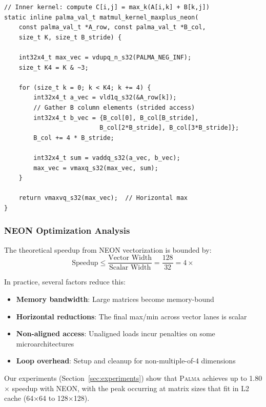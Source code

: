 \documentclass[11pt,a4paper]{article}
\theoremstyle{plain}
\theoremstyle{definition}
\newcommand{\palma}{\textsc{Palma}}
\begin{document}
\begin{lstlisting}[caption={NEON-optimized matrix multiplication kernel}]
// Inner kernel: compute C[i,j] = max_k(A[i,k] + B[k,j])
static inline palma_val_t matmul_kernel_maxplus_neon(
    const palma_val_t *A_row, const palma_val_t *B_col,
    size_t K, size_t B_stride) {
    
    int32x4_t max_vec = vdupq_n_s32(PALMA_NEG_INF);
    size_t K4 = K & ~3;
    
    for (size_t k = 0; k < K4; k += 4) {
        int32x4_t a_vec = vld1q_s32(&A_row[k]);
        // Gather B column elements (strided access)
        int32x4_t b_vec = {B_col[0], B_col[B_stride],
                          B_col[2*B_stride], B_col[3*B_stride]};
        B_col += 4 * B_stride;
        
        int32x4_t sum = vaddq_s32(a_vec, b_vec);
        max_vec = vmaxq_s32(max_vec, sum);
    }
    
    return vmaxvq_s32(max_vec);  // Horizontal max
}
\end{lstlisting}

\subsubsection{NEON Optimization Analysis}

The theoretical speedup from NEON vectorization is bounded by:
\begin{equation}
    \text{Speedup} \leq \frac{\text{Vector Width}}{\text{Scalar Width}} = \frac{128}{32} = 4\times
\end{equation}

In practice, several factors reduce this:
\begin{itemize}
    \item \textbf{Memory bandwidth}: Large matrices become memory-bound
    \item \textbf{Horizontal reductions}: The final max/min across vector lanes is scalar
    \item \textbf{Non-aligned access}: Unaligned loads incur penalties on some microarchitectures
    \item \textbf{Loop overhead}: Setup and cleanup for non-multiple-of-4 dimensions
\end{itemize}

Our experiments (Section~\ref{sec:experiments}) show that \palma{} achieves up to 1.80$\times$ speedup with NEON, with the peak occurring at matrix sizes that fit in L2 cache (64$\times$64 to 128$\times$128).
\end{document}
